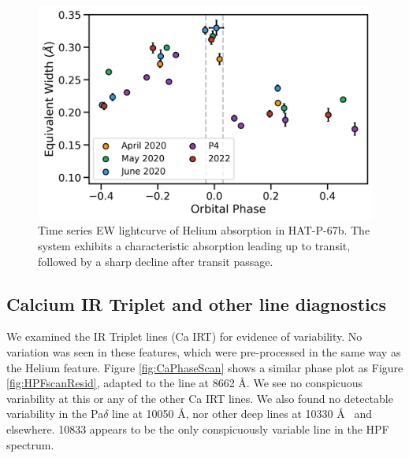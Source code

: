\documentclass[twocolumn]{aastex631}
\begin{document}
\begin{figure}
    \includegraphics[width=\linewidth]{figures/HAT_P_67b_Helium10830EW_byCampaign.png}
    \caption{Time series EW lightcurve of Helium absorption in HAT-P-67b.  The system exhibits a characteristic absorption leading up to transit, followed by a sharp decline after transit passage.  }
    \label{fig:HPFtimeseries}
\end{figure}

\subsection{Calcium IR Triplet and other line diagnostics}
We examined the  IR Triplet lines (Ca IRT) for evidence of variability.  No variation was seen in these features, which were pre-processed in the same way as the Helium feature.  Figure \ref{fig:CaPhaseScan} shows a similar phase plot as Figure \ref{fig:HPFscanResid}, adapted to the line at 8662 \AA.  We see no conspicuous variability at this or any of the other Ca IRT lines.  We also found no detectable variability in the Pa$\delta$ line at 10050 \AA, nor other deep lines at 10330 \AA~ and elsewhere.   10833 appears to be the only conspicuously variable line in the HPF spectrum.
\end{document}
